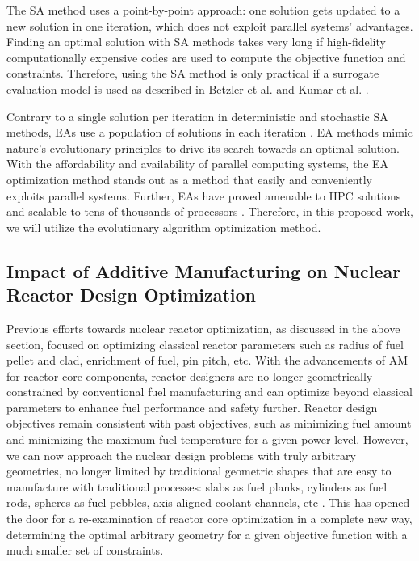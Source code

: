 The \gls{SA} method uses a point-by-point approach:
one solution gets updated to a new solution in one iteration, which does not 
exploit parallel systems' advantages.
Finding an optimal solution with \gls{SA} methods takes very 
long if high-fidelity computationally expensive codes are used to compute 
the objective function and constraints.
Therefore, using the \gls{SA} method is only practical if a 
surrogate evaluation model is used as described in Betzler et al. 
\cite{betzler_design_2019} and Kumar et al. \cite{kumar_new_2015}.

Contrary to a single solution per iteration in deterministic and stochastic 
\gls{SA} methods, \glspl{EA} use a population of solutions in each 
iteration \cite{deb_multi-objective_2001}. 
\gls{EA} methods mimic nature's evolutionary principles to drive 
its search towards an optimal solution. 
With the affordability and availability of parallel computing systems, the 
\gls{EA} optimization method stands out as a method 
that easily and conveniently exploits parallel systems. 
Further, \glspl{EA} have proved amenable to \gls{HPC} solutions and 
scalable to tens of thousands of processors \cite{kropaczek_constraint_2019}. 
Therefore, in this proposed work, we will utilize the evolutionary algorithm 
optimization method. 

\subsection{Impact of Additive Manufacturing on Nuclear Reactor Design 
Optimization}
Previous efforts towards nuclear reactor optimization, as discussed in the above 
section, focused on optimizing classical reactor parameters such as 
radius of fuel pellet and clad, enrichment of fuel, pin pitch, etc. 
With the advancements of \gls{AM} for reactor core components, reactor designers 
are no longer geometrically constrained by conventional fuel manufacturing and 
can optimize beyond classical parameters to enhance fuel performance and safety 
further. 
Reactor design objectives remain consistent with past objectives, such as 
minimizing fuel amount and minimizing the maximum fuel temperature for a given 
power level.
However, we can now approach the nuclear design problems with truly arbitrary 
geometries, no longer limited by traditional geometric shapes that are 
easy to manufacture with traditional processes: slabs as fuel planks, cylinders 
as fuel rods, spheres as fuel pebbles, axis-aligned coolant channels, etc  
\cite{sobes_artificial_2020}.
This has opened the door for a re-examination of reactor core 
optimization in a complete new way, determining the optimal arbitrary geometry 
for a given objective function \cite{sobes_artificial_2020} with a much smaller 
set of constraints. 

